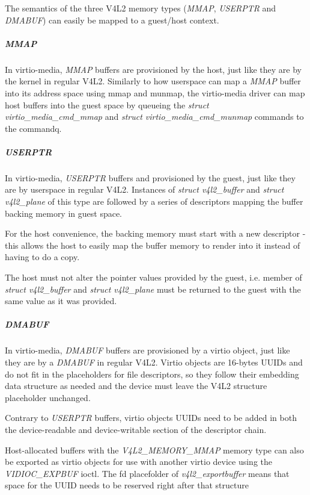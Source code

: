 The semantics of the three V4L2 memory types (\textit{MMAP}, \textit{USERPTR}
and \textit{DMABUF}) can easily be mapped to a guest/host context.

\subparagraph{MMAP}

In virtio-media, \textit{MMAP} buffers are provisioned by the host, just like
they are by the kernel in regular V4L2. Similarly to how userspace can map a
\textit{MMAP} buffer into its address space using mmap and munmap, the
virtio-media driver can map host buffers into the guest space by queueing the
\textit{struct virtio_media_cmd_mmap} and \textit{struct virtio_media_cmd_munmap}
commands to the commandq.

\subparagraph{USERPTR}

In virtio-media, \textit{USERPTR} buffers and provisioned by the guest, just
like they are by userspace in regular V4L2. Instances of \textit{struct v4l2_buffer}
and \textit{struct v4l2_plane} of this type are followed by a series of
descriptors mapping the buffer backing memory in guest space.

For the host convenience, the backing memory must start with a new descriptor
- this allows the host to easily map the buffer memory to render into it
instead of having to do a copy.

The host must not alter the pointer values provided by the guest, i.e.
 member of \textit{struct v4l2_buffer} and
\textit{struct v4l2_plane} must be returned to the guest with the same value
as it was provided.

\subparagraph{DMABUF}

In virtio-media, \textit{DMABUF} buffers are provisioned by a virtio object,
just like they are by a \textit{DMABUF} in regular V4L2. Virtio objects are
16-bytes UUIDs and do not fit in the placeholders for file descriptors, so
they follow their embedding data structure as needed and the device must
leave the V4L2 structure placeholder unchanged.

Contrary to \textit{USERPTR} buffers, virtio objects UUIDs need to be added in
both the device-readable and device-writable section of the descriptor chain.

Host-allocated buffers with the \textit{V4L2_MEMORY_MMAP} memory type can also
be exported as virtio objects for use with another virtio device using the
\textit{VIDIOC_EXPBUF} ioctl. The fd placefolder of \textit{v4l2_exportbuffer}
means that space for the UUID needs to be reserved right after that structure

